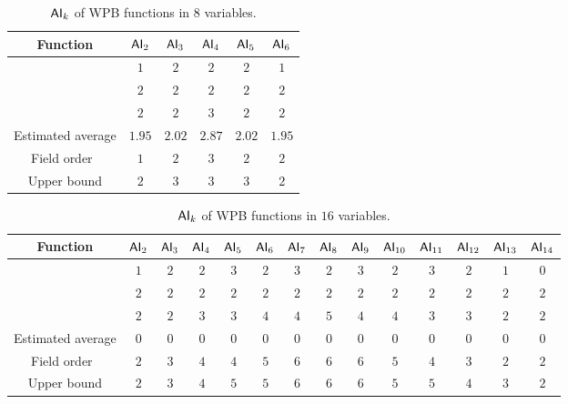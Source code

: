 \documentclass[11pt]{llncs}
\begin{document}
\begin{table}[h]
	\center 
	\begin{tabular}{|c| c|c|c|c|c|}
		\hline
		Function &  $\mathsf{AI}_{2}$ & $\mathsf{AI}_{3}$ & $\mathsf{AI}_{4}$ &  $\mathsf{AI}_{5}$ & $\mathsf{AI}_{6}$  \\ \hline 
		\cite{AMC:DalMal23} & $1$ &  $2$ & $2$  &  $2$ & $1$ \\ \hline
		\cite{Mat:ZJZQ23} & $2$ &  $2$ & $2$  &  $2$ & $2$ \\ \hline
        \cite{CC:TangLiu19} & $2$ &  $2$ & $3$  &  $2$ & $2$ \\ \hline
		Estimated average & $1.95$ &  $2.02$ & $2.87$  &  $2.02$ & $1.95$ \\ \hline
		Field order~\cite{eprint:Meaux24} &$ 1$& $2$& $3$& $2$ &$2$ \\	\hline
		Upper bound & $2$ &  $3$ & $3$  &  $3$ & $2$ \\	\hline
	
		
	\end{tabular}
	\caption{$\mathsf{AI}_{k}$ of WPB functions in $8$ variables.}
	\label{tab:WPB8}
\end{table}


\begin{table}[h]
	\center 
	\begin{tabular}{|c| c|c|c|c|c| c|c|c|c|c| c|c|c| }
		\hline
		Function &  $\mathsf{AI}_{2}$ & $\mathsf{AI}_{3}$ & $\mathsf{AI}_{4}$ &  $\mathsf{AI}_{5}$ & $\mathsf{AI}_{6}$ &  $\mathsf{AI}_{7}$ & $\mathsf{AI}_{8}$ & $\mathsf{AI}_{9}$ &  $\mathsf{AI}_{10}$ & $\mathsf{AI}_{11}$ &  $\mathsf{AI}_{12}$ & $\mathsf{AI}_{13}$ & $\mathsf{AI}_{14}$ \\ \hline 
		
\cite{AMC:DalMal23}		&$ 1$& $2$& $2$& $3$ &$2$ & $3$ &$2$ &$3$ &$2$ &$3$ &$2$ &$1$
	 &0 \\ \hline
\cite{Mat:ZJZQ23}		&$ 2$& $2$& $2$& $2$ &$2$ & $2$ &$2$ &$2$ &$2$ &$2$ &$2$ &$2$
&$2$ \\ \hline
\cite{CC:TangLiu19}		&$ 2$& $2$& $3$& $3$ &$4$ & $4$ &$5$ &$4$ &$4$ &$3$ &$3$ &$2$
&$2$ \\ \hline	
		Estimated average &$ 0$& $0$& $0$& $0$ &$0$ & 0 &0 &0 &0 &0 &0 &0 &0 \\ \hline
		Field order~\cite{eprint:Meaux24} &$ 2$& $3$& $4$& $4$ &$5$ & $6$ &$6$ &$6$ &$5$ &$4$ &$3$ &$2$ &$2$ \\	\hline
		Upper bound &$ 2$& $3$& $4$& $5$ &$5$ & $6$ &$6$ &$6$ &$5$ &$5$ &$4$ &$3$ &$2$  \\	\hline
		
		
	\end{tabular}
	\caption{$\mathsf{AI}_{k}$ of WPB functions in $16$ variables.}
	\label{tab:WPB16}
\end{table}
\end{document}
